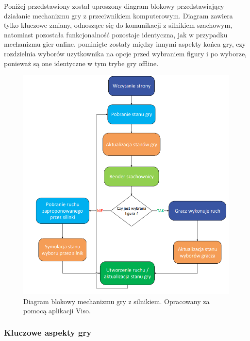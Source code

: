 \documentclass[12pt,a4paper]{article}
\begin{document}
\newpage

\noindent
Poniżej przedstawiony został uproszony diagram blokowy przedstawiający działanie mechanizmu gry z przeciwnikiem komputerowym. Diagram zawiera tylko kluczowe zmiany, odnoszące się do komunikacji z silnikiem szachowym, natomiast pozostała funkcjonalność pozostaje identyczna, jak w przypadku mechanizmu gier online. pominięte zostały między innymi aspekty końca gry, czy rozdzielnia wyborów uzytkownika na opcje przed wybraniem figury i po wyborze, ponieważ są one identyczne w tym trybe gry offline.

\vspace{1cm}
\begin{figure}[h!]
    \centering
    \includegraphics[width=1\textwidth]{images/diagram_enggry.png}
    \caption{Diagram blokowy mechanizmu gry z silnikiem. Opracowany za pomocą aplikacji Viso.}
\end{figure}

\newpage

\subsubsection{Kluczowe aspekty gry}
\end{document}
